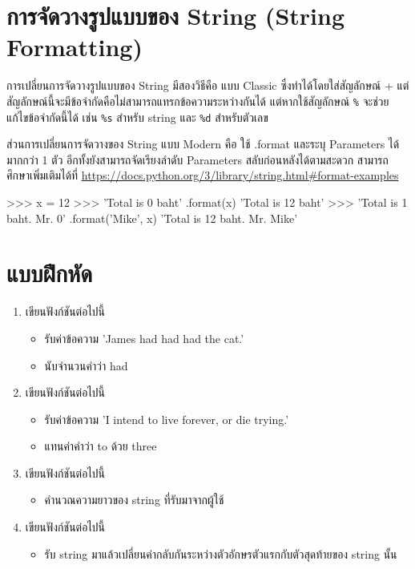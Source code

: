 \section{การจัดวางรูปแบบของ String (String Formatting)}

การเปลี่ยนการจัดวางรูปแบบของ String มีสองวิธีคือ แบบ Classic ซึ่งทำได้โดยใส่สัญลักษณ์ + แต่สัญลักษณ์นี้จะมีข้อจำกัดคือไม่สามารถแทรกข้อความระหว่างกันได้ แต่หากใช้สัญลักษณ์ \texttt{\%} จะช่วยแก้ไขข้อจำกัดนี้ได้ เช่น \texttt{\%s} สำหรับ string และ \texttt{\%d} สำหรับตัวเลข 

\begin{codelist}{}{}
\end{codelist}

\begin{codelist}{}{}
\end{codelist}



ส่วนการเปลี่ยนการจัดวางของ String แบบ Modern คือ ใช้ .format และระบุ Parameters ได้มากกว่า 1 ตัว อีกทั้งยังสามารถจัดเรียงลำดับ Parameters สลับก่อนหลังได้ตามสะดวก สามารถศึกษาเพิ่มเติมได้ที่ \url{https://docs.python.org/3/library/string.html\#format-examples}

\begin{codelist}{}{}
>>> x = 12
>>> 'Total is {0} baht' .format(x)
'Total is 12 baht'
>>> 'Total is {1} baht. Mr. {0}' .format('Mike', x)
'Total is 12 baht. Mr. Mike'
\end{codelist}


\section{แบบฝึกหัด}
\begin{enumerate} 
\item 	เขียนฟังก์ชันต่อไปนี้
\begin{itemize}
\item 	รับค่าข้อความ 'James had had had the cat.'
\item 	นับจำนวนคำว่า had
\end{itemize}
\item 	เขียนฟังก์ชันต่อไปนี้
\begin{itemize}
\item 	รับค่าข้อความ  'I intend to live forever, or die trying.'
\item 	แทนค่าคำว่า to ด้วย three
\end{itemize}
\item 	เขียนฟังก์ชันต่อไปนี้
\begin{itemize}
\item 	คำนวณความยาวของ string ที่รับมาจากผู้ใช้
\end{itemize}
\item 	เขียนฟังก์ชันต่อไปนี้
\begin{itemize}
\item 	รับ string มาแล้วเปลี่ยนค่ากลับกันระหว่างตัวอักษรตัวแรกกับตัวสุดท้ายของ string นั้น
\end{itemize}
\end{enumerate}



